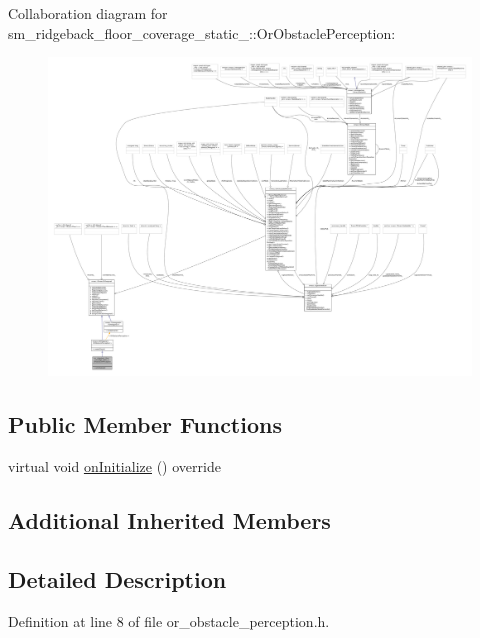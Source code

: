 Collaboration diagram for sm\+\_\+ridgeback\+\_\+floor\+\_\+coverage\+\_\+static\+\_\+:\+:Or\+Obstacle\+Perception\+:
\nopagebreak
\begin{figure}[H]
\begin{center}
\leavevmode
\includegraphics[width=350pt]{classsm__ridgeback__floor__coverage__static__1_1_1OrObstaclePerception__coll__graph}
\end{center}
\end{figure}
\subsection*{Public Member Functions}
\begin{DoxyCompactItemize}
\item 
virtual void \hyperlink{classsm__ridgeback__floor__coverage__static__1_1_1OrObstaclePerception_a4a3e73bb6260305589266eacd773a584}{on\+Initialize} () override
\end{DoxyCompactItemize}
\subsection*{Additional Inherited Members}


\subsection{Detailed Description}


Definition at line 8 of file or\+\_\+obstacle\+\_\+perception.\+h.



